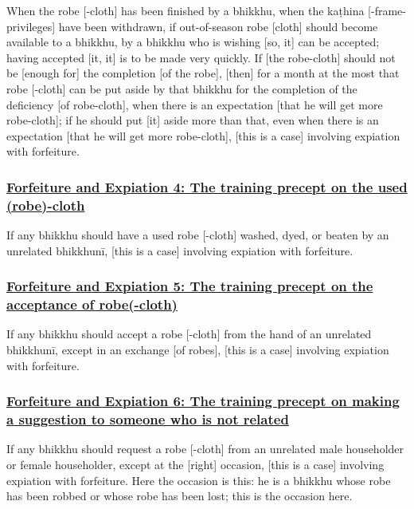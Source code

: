 When the robe [-cloth] has been finished by a bhikkhu, when the kaṭhina [-frame-privileges] have been withdrawn, if out-of-season robe [cloth] should become available to a bhikkhu, by a bhikkhu who is wishing [so, it] can be accepted; having accepted [it, it] is to be made very quickly. If [the robe-cloth] should not be [enough for] the completion [of the robe], [then] for a month at the most that robe [-cloth] can be put aside by that bhikkhu for the completion of the deficiency [of robe-cloth], when there is an expectation [that he will get more robe-cloth]; if he should put [it] aside more than that, even when there is an expectation [that he will get more robe-cloth], [this is a case] involving expiation with forfeiture.



\subsubsection*{\hyperref[np4]{Forfeiture and Expiation 4: The training precept on the used (robe)-cloth}}
\label{forf-exp4}

If any bhikkhu should have a used robe [-cloth] washed, dyed, or beaten by an unrelated bhikkhunī, [this is a case] involving expiation with forfeiture.



\subsubsection*{\hyperref[np5]{Forfeiture and Expiation 5: The training precept on the acceptance of robe(-cloth)}}
\label{forf-exp5}

If any bhikkhu should accept a robe [-cloth] from the hand of an unrelated bhikkhunī, except in an exchange [of robes], [this is a case] involving expiation with forfeiture.



\subsubsection*{\hyperref[np6]{Forfeiture and Expiation 6: The training precept on making a suggestion to someone who is not related}}
\label{forf-exp6}

If any bhikkhu should request a robe [-cloth] from an unrelated male householder or female householder, except at the [right] occasion, [this is a case] involving expiation with forfeiture. Here the occasion is this: he is a bhikkhu whose robe has been robbed or whose robe has been lost; this is the occasion here.



